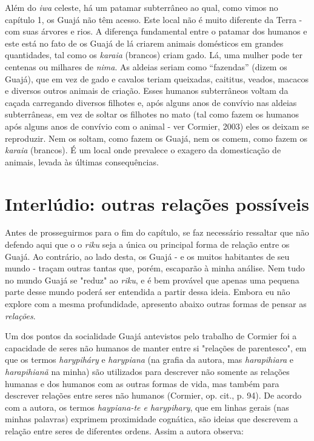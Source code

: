 Além do \emph{iwa} celeste, há um patamar subterrâneo ao qual, como
vimos no capítulo 1, os Guajá não têm acesso. Este local não é muito
diferente da Terra - com suas árvores e rios. A diferença fundamental
entre o patamar dos humanos e este está no fato de os Guajá de lá
criarem animais domésticos em grandes quantidades, tal como os
\emph{karaia} (brancos) criam gado. Lá, uma mulher pode ter centenas ou
milhares de \emph{nima}. As aldeias seriam como ``fazendas'' (dizem os
Guajá), que em vez de gado e cavalos teriam queixadas, caititus, veados,
macacos e diversos outros animais de criação. Esses humanos subterrâneos
voltam da caçada carregando diversos filhotes e, após alguns anos de
convívio nas aldeias subterrâneas, em vez de soltar os filhotes no mato
(tal como fazem os humanos após alguns anos de convívio com o animal -
ver Cormier, 2003) eles os deixam se reproduzir. Nem os soltam, como
fazem os Guajá, nem os comem, como fazem os \emph{karaia} (brancos). É
um local onde prevalece o exagero da domesticação de animais, levada às
últimas consequências.

\section{Interlúdio: outras relações
possíveis}\label{interluxfadio-outras-relauxe7uxf5es-possuxedveis}

Antes de prosseguirmos para o fim do capítulo, se faz necessário
ressaltar que não defendo aqui que o o \emph{riku} seja a única ou
principal forma de relação entre os Guajá. Ao contrário, ao lado desta,
os Guajá - e os muitos habitantes de seu mundo - traçam outras tantas
que, porém, escaparão à minha análise. Nem tudo no mundo Guajá se
"reduz" ao \emph{riku}, e é bem provável que apenas uma pequena parte
desse mundo poderá ser entendida a partir dessa ideia. Embora eu não
explore com a mesma profundidade, apresento abaixo outras formas de
pensar as \emph{relações}.

Um dos pontos da socialidade Guajá antevistos pelo trabalho de Cormier
foi a capacidade de seres não humanos de manter entre si "relações de
parentesco", em que os termos \emph{harypiháry} e \emph{harypiana} (na
grafia da autora, mas \emph{harapihiara} e \emph{harapihianã} na minha)
são utilizados para descrever não somente as relações humanas e dos
humanos com as outras formas de vida, mas também para descrever relações
entre seres não humanos (Cormier, op. cit., p. 94). De acordo com a
autora, os termos \emph{haypiana-te e harypihary}, que em linhas gerais
(nas minhas palavras) exprimem proximidade cognática, são ideias que
descrevem a relação entre seres de diferentes ordens. Assim a autora
observa:

